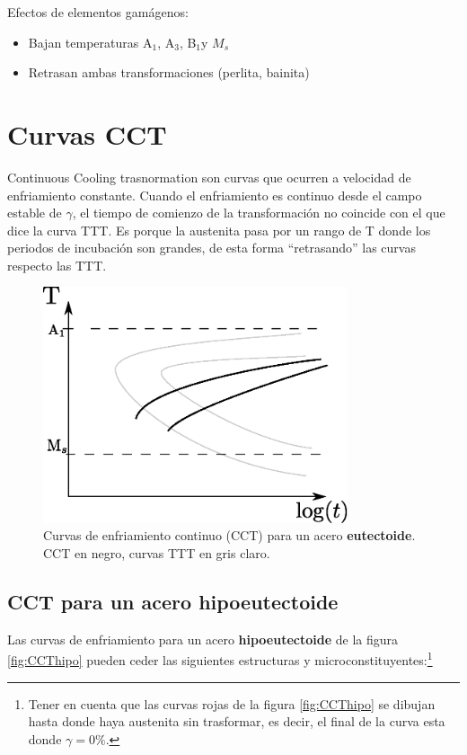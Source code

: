 \documentclass{article}
\newcommand{\Bs}{B\ensuremath{_{1}}}
\newcommand{\Aone}{A\ensuremath{_{1}}}
\newcommand{\Athree}{A\ensuremath{_{3}}}
\begin{document}
Efectos de elementos gamágenos:
\begin{itemize}
    \item Bajan temperaturas \Aone, \Athree, \Bs y $M_s$
    \item Retrasan ambas transformaciones (perlita, bainita)
\end{itemize}

\section{Curvas CCT}
Continuous Cooling trasnormation son curvas que ocurren a velocidad de enfriamiento constante. Cuando el enfriamiento es continuo desde el campo estable de $\gamma$, el tiempo de comienzo de la transformación no coincide con el que dice la curva TTT. Es porque la austenita pasa por un rango de T donde los periodos de incubación son grandes, de esta forma ``retrasando'' las curvas respecto las TTT.

\begin{figure}[htb!]
    \centering
    \includegraphics[width=0.8\textwidth]{fig/CCTeutect.eps}
    \caption{Curvas de enfriamiento continuo (CCT) para un acero \textbf{eutectoide}. CCT en negro, curvas TTT en gris claro.}
    \label{fig:CCTeutect}
\end{figure}

\subsection{CCT para un acero hipoeutectoide}
Las curvas de enfriamiento para un acero \textbf{hipoeutectoide} de la figura \ref{fig:CCThipo} pueden ceder las siguientes estructuras y microconstituyentes:\footnote{Tener en cuenta que las curvas rojas de la figura \ref{fig:CCThipo} se dibujan hasta donde haya austenita sin trasformar, es decir, el final de la curva esta donde $\gamma=0\%$.}
\end{document}
